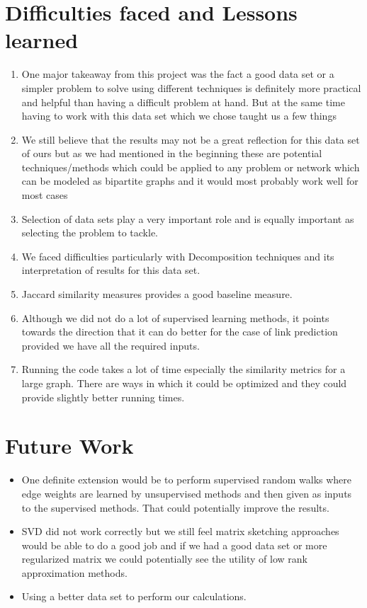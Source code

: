 \documentclass[letterpaper,twocolumn,11pt]{article}
\begin{document}
\section{ Difficulties faced and Lessons learned}
\begin{enumerate}

\item One major takeaway from this project was the fact a good data set or a simpler problem to solve using different techniques is definitely more practical and helpful than having a difficult problem at hand. But at the same time having to work with this data set which we chose taught us a few things
\item We still believe that the results may not be a great reflection for this data set of ours but as we had mentioned in the beginning these are potential techniques/methods which could be applied to any problem or network which can be modeled as bipartite graphs and it would most probably work well for most cases
\item Selection of data sets play a very important role and is equally important as selecting the problem to tackle.
\item We faced difficulties particularly with Decomposition techniques and its interpretation of results for this data set.
\item  Jaccard similarity measures provides a good baseline measure.
\item Although we did not do a lot of supervised learning methods, it points towards the direction that it can do better for the case of link prediction provided we have all the required inputs.

\item Running the code takes a lot of time especially the similarity metrics for a large graph. There are ways in which it could be optimized and they could provide slightly better running times.
  
\end{enumerate}


\section{Future Work}

\begin{itemize}
\item One definite extension would be to perform supervised random walks where edge weights are learned by unsupervised methods and then given as inputs to the supervised methods. That could potentially improve the results.
\item SVD did not work correctly but we still feel matrix sketching approaches would be able to do a good job and if we had a good data set or more regularized matrix we could potentially see the utility of low rank approximation methods.
\item Using a better data set to perform our calculations.
\end{itemize}
\end{document}
